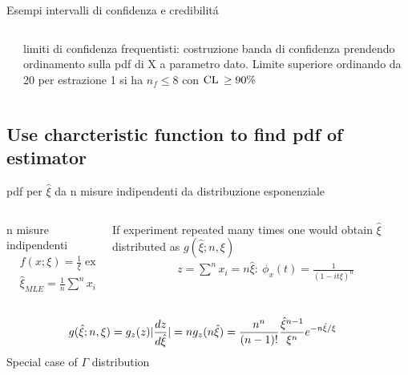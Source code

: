 \begin{wordonframe}{Esempi intervalli di confidenza e credibilit\'a}
\begin{columns}[T]
\begin{column}{0.3\textwidth}
\end{column}
\begin{column}{0.7\textwidth}
limiti di confidenza frequentisti: costruzione banda di confidenza prendendo ordinamento sulla pdf di X a parametro dato. Limite superiore ordinando da 20 per estrazione 1 si ha $n_f\leq8$ con $\operatorname{CL}{}\geq90\%$
\end{column}
\end{columns}
\end{wordonframe}

\subsection{Use charcteristic function to find pdf of estimator}

\begin{frame}{pdf per $\hat{\xi}$ da n misure indipendenti da distribuzione esponenziale}
\begin{columns}[T]\begin{column}{0.4\textwidth}
n misure indipendenti
\begin{align*}
&f(x;\xi)=\frac{1}{\xi}\exp{-\frac{x}{\xi}}\\
&\hat{\xi}_{MLE}=\frac{1}{n}\sum^nx_i
\end{align*}
\end{column}\begin{column}{0.6\textwidth}
If experiment repeated many times one would obtain $\hat{\xi}$ distributed as $g(\hat{\xi};n,\xi)$
\begin{align*}
&z=\sum^nx_i=n\hat{\xi}:\ \phi_x(t)=\frac{1}{(1-it\xi)^n}
\end{align*}
\end{column}\end{columns}
\begin{align*}
&g(\hat{\xi};n,\xi)=g_z(z)|\frac{d z}{d \hat{\xi}}|=ng_z(n\hat{\xi})=\frac{n^n}{(n-1)!}\frac{\hat{\xi}^{n-1}}{\xi^n}e^{-n\hat{\xi}/\xi}
\end{align*}
Special case of $\Gamma$ distribution
\end{frame}

